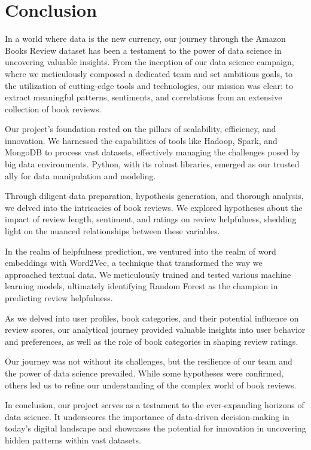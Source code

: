 \section{Conclusion}

In a world where data is the new currency, our journey through the Amazon Books Review dataset has been a testament to the power of data science in uncovering valuable insights. From the inception of our data science campaign, where we meticulously composed a dedicated team and set ambitious goals, to the utilization of cutting-edge tools and technologies, our mission was clear: to extract meaningful patterns, sentiments, and correlations from an extensive collection of book reviews.

Our project's foundation rested on the pillars of scalability, efficiency, and innovation. We harnessed the capabilities of tools like Hadoop, Spark, and MongoDB to process vast datasets, effectively managing the challenges posed by big data environments. Python, with its robust libraries, emerged as our trusted ally for data manipulation and modeling.

Through diligent data preparation, hypothesis generation, and thorough analysis, we delved into the intricacies of book reviews. We explored hypotheses about the impact of review length, sentiment, and ratings on review helpfulness, shedding light on the nuanced relationships between these variables.

In the realm of helpfulness prediction, we ventured into the realm of word embeddings with Word2Vec, a technique that transformed the way we approached textual data. We meticulously trained and tested various machine learning models, ultimately identifying Random Forest as the champion in predicting review helpfulness.

As we delved into user profiles, book categories, and their potential influence on review scores, our analytical journey provided valuable insights into user behavior and preferences, as well as the role of book categories in shaping review ratings.

Our journey was not without its challenges, but the resilience of our team and the power of data science prevailed. While some hypotheses were confirmed, others led us to refine our understanding of the complex world of book reviews.

In conclusion, our project serves as a testament to the ever-expanding horizons of data science. It underscores the importance of data-driven decision-making in today's digital landscape and showcases the potential for innovation in uncovering hidden patterns within vast datasets.

